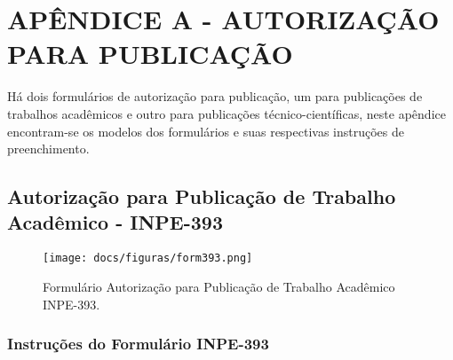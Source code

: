 \hypertarget{estilo:apendice}{} %
\renewcommand{\thechapter}{}%
\chapter{APÊNDICE A - AUTORIZAÇÃO PARA PUBLICAÇÃO}	%
\label{apendiceA}	%
\renewcommand{\thechapter}{A}%

Há dois formulários de autorização para publicação, um para publicações de trabalhos acadêmicos e outro para publicações técnico-científicas, neste apêndice encontram-se os modelos dos formulários e suas respectivas instruções de preenchimento. 

\section{Autorização para Publicação de Trabalho Acadêmico - INPE-393}

\label{instr393}

	\begin{figure}[!ht]
		\caption{Formulário Autorização para Publicação de Trabalho Acadêmico INPE-393.}
		\vspace{6mm}	%
		\centering
   		\texttt{[image: docs/figuras/form393.png]}	   
 		\label{form393}
	\end{figure}


\subsection{Instruções do Formulário INPE-393} 

